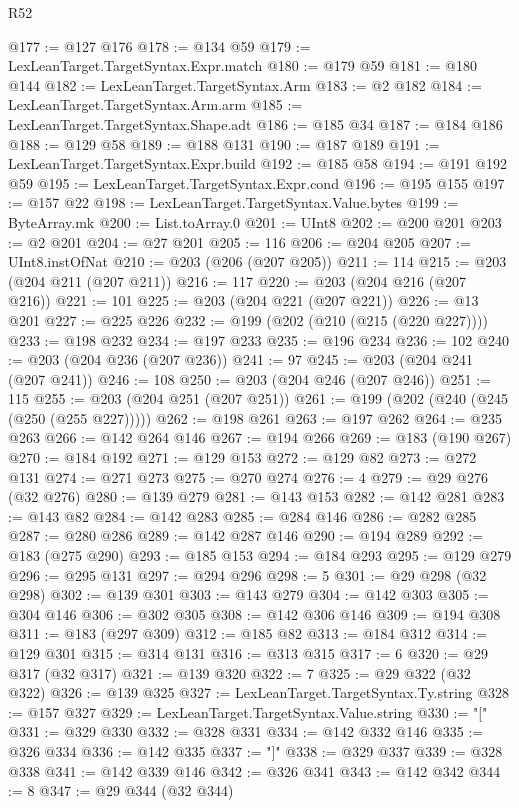 \begin{lexlean}{R52}
\begin{coremodule}
{{{{{{{{{{{{{{{{{{{{{{{{{{{{{{{{{{{{{{{{{{{{{{{{{{{{{{{{{{{{{{{{{{{{{{{{{{{{{{{{{{{{{{{{{{{{{{{{{{{{{{{{{{{{{{{{{{{{{{{{{{{{{{{{{{{{{{{{{{{{{{{{{{{{{{{{{{{{{{{{{{{{{{{{{{{{{{{{{{{{{{{{{{{{{{{{{{{{{{@177 := @127 @176
@178 := @134 @59
@179 := LexLeanTarget.TargetSyntax.Expr.match
@180 := @179 @59
@181 := @180 @144
@182 := LexLeanTarget.TargetSyntax.Arm
@183 := @2 @182
@184 := LexLeanTarget.TargetSyntax.Arm.arm
@185 := LexLeanTarget.TargetSyntax.Shape.adt
@186 := @185 @34
@187 := @184 @186
@188 := @129 @58
@189 := @188 @131
@190 := @187 @189
@191 := LexLeanTarget.TargetSyntax.Expr.build
@192 := @185 @58
@194 := @191 @192 @59
@195 := LexLeanTarget.TargetSyntax.Expr.cond
@196 := @195 @155
@197 := @157 @22
@198 := LexLeanTarget.TargetSyntax.Value.bytes
@199 := ByteArray.mk
@200 := List.toArray.{0}
@201 := UInt8
@202 := @200 @201
@203 := @2 @201
@204 := @27 @201
@205 := 116
@206 := @204 @205
@207 := UInt8.instOfNat
@210 := @203 (@206 (@207 @205))
@211 := 114
@215 := @203 (@204 @211 (@207 @211))
@216 := 117
@220 := @203 (@204 @216 (@207 @216))
@221 := 101
@225 := @203 (@204 @221 (@207 @221))
@226 := @13 @201
@227 := @225 @226
@232 := @199 (@202 (@210 (@215 (@220 @227))))
@233 := @198 @232
@234 := @197 @233
@235 := @196 @234
@236 := 102
@240 := @203 (@204 @236 (@207 @236))
@241 := 97
@245 := @203 (@204 @241 (@207 @241))
@246 := 108
@250 := @203 (@204 @246 (@207 @246))
@251 := 115
@255 := @203 (@204 @251 (@207 @251))
@261 := @199 (@202 (@240 (@245 (@250 (@255 @227)))))
@262 := @198 @261
@263 := @197 @262
@264 := @235 @263
@266 := @142 @264 @146
@267 := @194 @266
@269 := @183 (@190 @267)
@270 := @184 @192
@271 := @129 @153
@272 := @129 @82
@273 := @272 @131
@274 := @271 @273
@275 := @270 @274
@276 := 4
@279 := @29 @276 (@32 @276)
@280 := @139 @279
@281 := @143 @153
@282 := @142 @281
@283 := @143 @82
@284 := @142 @283
@285 := @284 @146
@286 := @282 @285
@287 := @280 @286
@289 := @142 @287 @146
@290 := @194 @289
@292 := @183 (@275 @290)
@293 := @185 @153
@294 := @184 @293
@295 := @129 @279
@296 := @295 @131
@297 := @294 @296
@298 := 5
@301 := @29 @298 (@32 @298)
@302 := @139 @301
@303 := @143 @279
@304 := @142 @303
@305 := @304 @146
@306 := @302 @305
@308 := @142 @306 @146
@309 := @194 @308
@311 := @183 (@297 @309)
@312 := @185 @82
@313 := @184 @312
@314 := @129 @301
@315 := @314 @131
@316 := @313 @315
@317 := 6
@320 := @29 @317 (@32 @317)
@321 := @139 @320
@322 := 7
@325 := @29 @322 (@32 @322)
@326 := @139 @325
@327 := LexLeanTarget.TargetSyntax.Ty.string
@328 := @157 @327
@329 := LexLeanTarget.TargetSyntax.Value.string
@330 := "["
@331 := @329 @330
@332 := @328 @331
@334 := @142 @332 @146
@335 := @326 @334
@336 := @142 @335
@337 := "]"
@338 := @329 @337
@339 := @328 @338
@341 := @142 @339 @146
@342 := @326 @341
@343 := @142 @342
@344 := 8
@347 := @29 @344 (@32 @344)
}}}}}}}}}}}}}}}}}}}}}}}}}}}}}}}}}}}}}}}}}}}}}}}}}}}}}}}}}}}}}}}}}}}}}}}}}}}}}}}}}}}}}}}}}}}}}}}}}}}}}}}}}}}}}}}}}}}}}}}}}}}}}}}}}}}}}}}}}}}}}}}}}}}}}}}}}}}}}}}}}}}}}}}}}}}}}}}}}}}}}}}}}}}}}}}}}}}}}}
\end{coremodule}
\end{lexlean}
